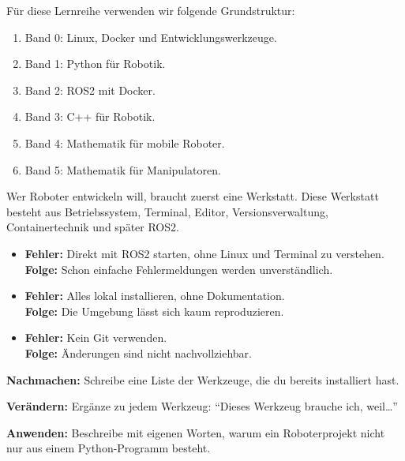 \begin{loesungBox}
Für diese Lernreihe verwenden wir folgende Grundstruktur:
\begin{enumerate}
  \item Band 0: Linux, Docker und Entwicklungswerkzeuge.
  \item Band 1: Python für Robotik.
  \item Band 2: ROS2 mit Docker.
  \item Band 3: C++ für Robotik.
  \item Band 4: Mathematik für mobile Roboter.
  \item Band 5: Mathematik für Manipulatoren.
\end{enumerate}
\end{loesungBox}

\begin{merksatzBox}
Wer Roboter entwickeln will, braucht zuerst eine Werkstatt. Diese Werkstatt
besteht aus Betriebssystem, Terminal, Editor, Versionsverwaltung,
Containertechnik und später ROS2.
\end{merksatzBox}

\begin{fehlerBox}
\begin{itemize}
  \item \textbf{Fehler:} Direkt mit ROS2 starten, ohne Linux und Terminal zu verstehen.\\
        \textbf{Folge:} Schon einfache Fehlermeldungen werden unverständlich.
  \item \textbf{Fehler:} Alles lokal installieren, ohne Dokumentation.\\
        \textbf{Folge:} Die Umgebung lässt sich kaum reproduzieren.
  \item \textbf{Fehler:} Kein Git verwenden.\\
        \textbf{Folge:} Änderungen sind nicht nachvollziehbar.
\end{itemize}
\end{fehlerBox}

\begin{uebungBox}
\textbf{Nachmachen:} Schreibe eine Liste der Werkzeuge, die du bereits installiert hast.

\textbf{Verändern:} Ergänze zu jedem Werkzeug: \enquote{Dieses Werkzeug brauche ich, weil\ldots}

\textbf{Anwenden:} Beschreibe mit eigenen Worten, warum ein Roboterprojekt
nicht nur aus einem Python-Programm besteht.
\end{uebungBox}


